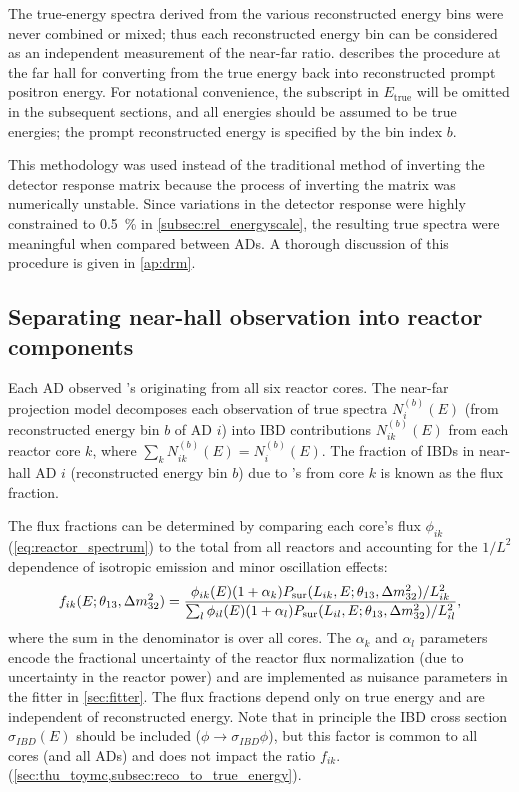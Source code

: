 The true-energy spectra derived from the various reconstructed energy bins
were never combined or mixed;
thus each reconstructed energy bin can be considered as an independent measurement
of the near-far ratio.
 describes the procedure at the far hall
for converting from the true \nuebar{} energy back into reconstructed prompt positron energy.
For notational convenience, the subscript in $E_{\text{true}}$ will be omitted
in the subsequent sections,
and all energies should be assumed to be true \nuebar{} energies;
the prompt reconstructed energy is specified by the bin index $b$.

This methodology was used instead of the traditional method of
inverting the detector response matrix
because the process of inverting the matrix was numerically unstable.
Since variations in the detector response were highly constrained
to \SI{0.5}{\percent} in \cref{subsec:rel_energyscale},
the resulting true \nuebar{} spectra were meaningful when compared between ADs.
A thorough discussion of this procedure is given in \cref{ap:drm}.

\subsection{Separating near-hall observation into reactor components}
\label{subsec:flux_fraction}

Each AD observed \nuebar{}'s originating from all six reactor cores.
The near-far projection model decomposes each observation
of true \nuebar{} spectra $N_i^{(b)}(E)$
(from reconstructed energy bin $b$ of AD $i$)
into IBD contributions $N_{ik}^{(b)}(E)$ from each reactor core $k$,
where $\sum_k N_{ik}^{(b)}(E) = N_i^{(b)}(E)$.
The fraction of IBDs in near-hall AD $i$
(reconstructed energy bin $b$)
due to \nuebar{}'s from core $k$ is known as the flux fraction.

The flux fractions can be determined
by comparing each core's \nuebar{} flux $\phi_{ik}$ (\cref{eq:reactor_spectrum})
to the total from all reactors and
accounting for the $1/L^2$ dependence of isotropic \nuebar{} emission
and minor oscillation effects:
\begin{equation}\label{eq:flux_fraction}
    f_{ik}(E;\theta_{13},\Delta m^2_{32}) = \frac{
        \phi_{ik}(E)(1+\alpha_k) P_\text{sur} (L_{ik}, E;\theta_{13},\Delta m^2_{32})/L_{ik}^2
    }{
    \sum_l \phi_{il}(E)(1+\alpha_l)P_\text{sur}(L_{il}, E;\theta_{13},\Delta m^2_{32})/L_{il}^2
    },
\end{equation}
where the sum in the denominator is over all cores.
The $\alpha_k$ and $\alpha_l$ parameters
encode the fractional uncertainty of the reactor flux normalization
(due to uncertainty in the reactor power)
and are implemented as nuisance parameters in the fitter in \cref{sec:fitter}.
The flux fractions depend only on true \nuebar{} energy
and are independent of reconstructed energy.
Note that in principle the IBD cross section $\sigma_{IBD}(E)$
should be included ($\phi \to \sigma_{IBD}\phi$),
but this factor is common to all cores (and all ADs)
and does not impact the ratio $f_{ik}$.
(\cref{sec:thu_toymc,subsec:reco_to_true_energy}).


